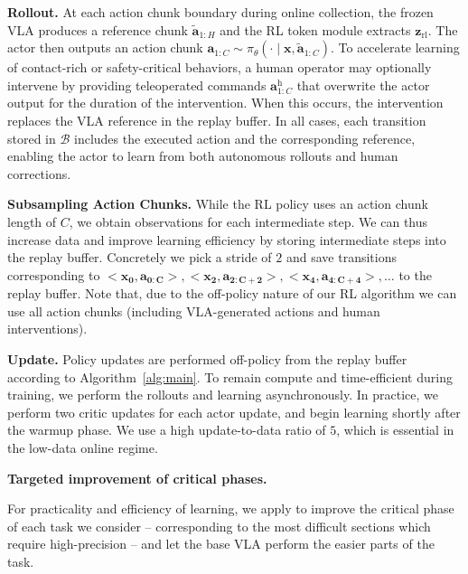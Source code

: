 \textbf{Rollout.} At each action chunk boundary during online collection, the frozen VLA produces a reference chunk $\tilde{\mathbf{a}}_{1:H}$ and the RL token module extracts $\mathbf{z}_{\text{rl}}$. The actor then outputs an action chunk $\mathbf{a}_{1:C} \sim \pi_\theta(\cdot \mid \mathbf{x}, \tilde{\mathbf{a}}_{1:C})$.
To accelerate learning of contact-rich or safety-critical behaviors, a human operator may optionally intervene by providing teleoperated commands $\mathbf{a}^{\text{h}}_{1:C}$ that overwrite the actor output for the duration of the intervention. When this occurs, the intervention replaces the VLA reference in the replay buffer. In all cases, each transition stored in $\mathcal{B}$ includes the executed action and the corresponding reference, enabling the actor to learn from both autonomous rollouts and human corrections.





\textbf{Subsampling Action Chunks.} While the RL policy uses an action chunk length of $C$, we obtain observations for each intermediate step. We can thus increase data and improve learning efficiency by storing intermediate steps into the replay buffer. Concretely we pick a stride of $2$ and save transitions corresponding to $<\mathbf{x_0}, \mathbf{a_{0:C}}>, <\mathbf{x_2}, \mathbf{a_{2:C+2}}>, <\mathbf{x_4}, \mathbf{a_{4:C+4}}>, \dots$ to the replay buffer. Note that, due to the off-policy nature of our RL algorithm we can use all action chunks (including VLA-generated actions and human interventions).

\textbf{Update.} Policy updates are performed off-policy from the replay buffer according to Algorithm~\ref{alg:main}. To remain compute and time-efficient during training, we perform the rollouts and learning asynchronously. In practice, we perform two critic updates for each actor update, and begin learning shortly after the warmup phase. We use a high update-to-data ratio of $5$, which is essential in the low-data online regime.

\textbf{Targeted improvement of critical phases.}


For practicality and efficiency of learning, we apply \MethodName{} to improve the critical phase of each task we consider -- corresponding to the most difficult sections which require high-precision -- and let the base VLA perform the easier parts of the task.


